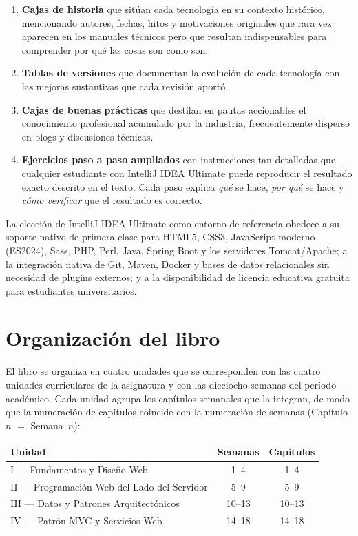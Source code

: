 \documentclass[11pt,a4paper,openany]{book}
\begin{document}
\begin{enumerate}
\item \textbf{Cajas de historia} que sitúan cada tecnología en su
contexto histórico, mencionando autores, fechas, hitos y motivaciones
originales que rara vez aparecen en los manuales técnicos pero que
resultan indispensables para comprender por qué las cosas son como son.
\item \textbf{Tablas de versiones} que documentan la evolución de cada
tecnología con las mejoras sustantivas que cada revisión aportó.
\item \textbf{Cajas de buenas prácticas} que destilan en pautas
accionables el conocimiento profesional acumulado por la industria,
frecuentemente disperso en blogs y discusiones técnicas.
\item \textbf{Ejercicios paso a paso ampliados} con instrucciones tan
detalladas que cualquier estudiante con IntelliJ IDEA Ultimate puede
reproducir el resultado exacto descrito en el texto. Cada paso explica
\emph{qué} se hace, \emph{por qué} se hace y \emph{cómo verificar} que
el resultado es correcto.
\end{enumerate}

La elección de IntelliJ IDEA Ultimate como entorno de referencia
obedece a su soporte nativo de primera clase para HTML5, CSS3,
JavaScript moderno (ES2024), Sass, PHP, Perl, Java, Spring Boot y los
servidores Tomcat/Apache; a la integración nativa de Git, Maven,
Docker y bases de datos relacionales sin necesidad de plugins externos;
y a la disponibilidad de licencia educativa gratuita para estudiantes
universitarios.

\section*{Organización del libro}

El libro se organiza en cuatro unidades que se corresponden con las
cuatro unidades curriculares de la asignatura y con las dieciocho
semanas del período académico. Cada unidad agrupa los capítulos
semanales que la integran, de modo que la numeración de capítulos
coincide con la numeración de semanas (Capítulo~$n$ $=$ Semana~$n$):

\begin{center}
\renewcommand{\arraystretch}{1.3}
\begin{tabular}{>{\raggedright\arraybackslash}p{4.3cm}cc}
\toprule
\textbf{Unidad} & \textbf{Semanas} & \textbf{Capítulos} \\
\midrule
I --- Fundamentos y Diseño Web & 1--4 & 1--4 \\
II --- Programación Web del Lado del Servidor & 5--9 & 5--9 \\
III --- Datos y Patrones Arquitectónicos & 10--13 & 10--13 \\
IV --- Patrón MVC y Servicios Web & 14--18 & 14--18 \\
\bottomrule
\end{tabular}
\end{center}
\end{document}
